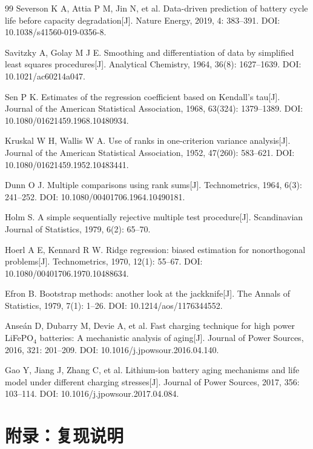 \documentclass[withoutpreface]{cumcmthesis}
\begin{document}
\begin{thebibliography}{99}
Severson K A, Attia P M, Jin N, et al. Data-driven prediction of battery cycle life before capacity degradation[J]. Nature Energy, 2019, 4: 383--391. DOI: 10.1038/s41560-019-0356-8.

Savitzky A, Golay M J E. Smoothing and differentiation of data by simplified least squares procedures[J]. Analytical Chemistry, 1964, 36(8): 1627--1639. DOI: 10.1021/ac60214a047.

Sen P K. Estimates of the regression coefficient based on Kendall's tau[J]. Journal of the American Statistical Association, 1968, 63(324): 1379--1389. DOI: 10.1080/01621459.1968.10480934.

Kruskal W H, Wallis W A. Use of ranks in one-criterion variance analysis[J]. Journal of the American Statistical Association, 1952, 47(260): 583--621. DOI: 10.1080/01621459.1952.10483441.

Dunn O J. Multiple comparisons using rank sums[J]. Technometrics, 1964, 6(3): 241--252. DOI: 10.1080/00401706.1964.10490181.

Holm S. A simple sequentially rejective multiple test procedure[J]. Scandinavian Journal of Statistics, 1979, 6(2): 65--70.

Hoerl A E, Kennard R W. Ridge regression: biased estimation for nonorthogonal problems[J]. Technometrics, 1970, 12(1): 55--67. DOI: 10.1080/00401706.1970.10488634.

Efron B. Bootstrap methods: another look at the jackknife[J]. The Annals of Statistics, 1979, 7(1): 1--26. DOI: 10.1214/aos/1176344552.

Anse\'an D, Dubarry M, Devie A, et al. Fast charging technique for high power LiFePO$_4$ batteries: A mechanistic analysis of aging[J]. Journal of Power Sources, 2016, 321: 201--209. DOI: 10.1016/j.jpowsour.2016.04.140.

Gao Y, Jiang J, Zhang C, et al. Lithium-ion battery aging mechanisms and life model under different charging stresses[J]. Journal of Power Sources, 2017, 356: 103--114. DOI: 10.1016/j.jpowsour.2017.04.084.
\end{thebibliography}

\newpage
\section*{附录：复现说明}
\end{document}
